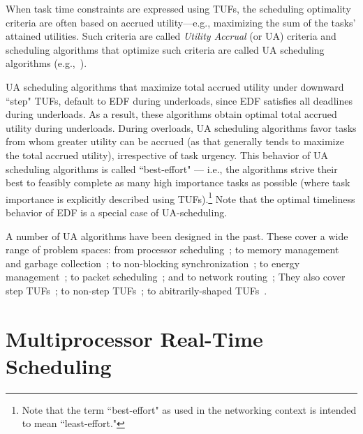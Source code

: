 \documentclass[12pt,dvips]{report}
\begin{document}
When task time constraints are expressed using TUFs, the scheduling optimality criteria are often based on accrued utility---e.g., maximizing the sum of the tasks' attained utilities. Such criteria are called \textit{Utility Accrual} (or UA) criteria and scheduling algorithms that optimize such criteria are called UA scheduling algorithms (e.g.,~\cite{DASA,loc86}).

UA scheduling algorithms that maximize total accrued utility under downward ``step" TUFs, default to EDF during underloads, since EDF satisfies all deadlines during underloads. As a result, these algorithms obtain optimal total accrued utility during underloads. During overloads, UA scheduling algorithms favor tasks from whom greater utility can be accrued (as that generally tends to maximize the total accrued utility), irrespective of task urgency. This behavior of UA scheduling algorithms is called ``best-effort" --- i.e., the algorithms strive their best to feasibly complete as many high importance tasks as possible (where task importance is explicitly described using TUFs).\footnote{Note that the term ``best-effort" as used in the networking context is intended to mean ``least-effort."} Note that the optimal timeliness behavior of EDF is a special case of UA-scheduling. 

A number of UA algorithms have been designed in the past. These cover a wide range of problem spaces: from processor scheduling~\cite{loc86, DASA, cho-thesis06, Li-Thesis, Li04, Li06, cho10};
to memory management and garbage collection~\cite{cho09-gc, cho07-gc, Feizabadi05-gc};
to non-blocking synchronization~\cite{cho-thesis06, cho_lock_free, cho_wait_free2};
to energy management~\cite{wu-thesis, Wu07, Balli07, Wu06};
to packet scheduling~\cite{gene-thesis, gene04}; and
to network routing~\cite{karthik-thesis, karthick06, Ramaswamy02};
They also cover step TUFs~\cite{DASA};
to non-step TUFs~\cite{cho-thesis06, cho_lock_free, cho_wait_free2, gene-thesis, wu-thesis, karthik-thesis, Ramaswamy02};
to abitrarily-shaped TUFs~\cite{Li-Thesis}.


\section{Multiprocessor Real-Time Scheduling}
\end{document}
